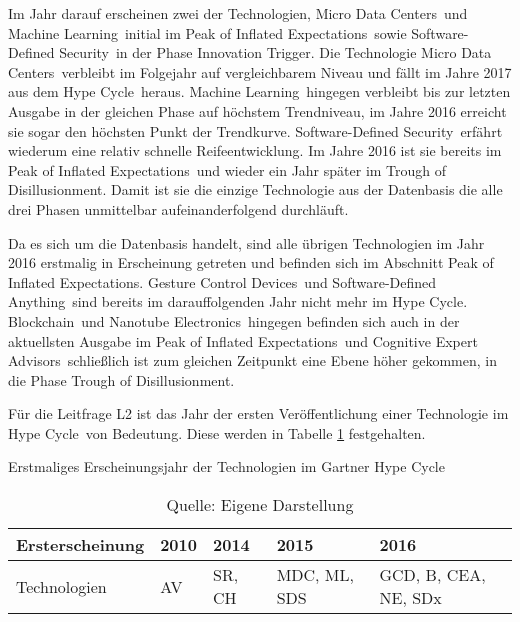 Im Jahr darauf erscheinen zwei der Technologien, \glqq Micro Data Centers\grqq~und \glqq Machine Learning\grqq~initial im \glqq Peak of Inflated Expectations\grqq~sowie \glqq Software-Defined Security\grqq~in der Phase \glqq Innovation Trigger\grqq. Die Technologie \glqq Micro Data Centers\grqq~verbleibt im Folgejahr auf vergleichbarem Niveau und fällt im Jahre 2017 aus dem \glqq Hype Cycle\grqq~heraus. \glqq Machine Learning\grqq~hingegen verbleibt bis zur letzten Ausgabe in der gleichen Phase auf höchstem Trendniveau, im Jahre 2016 erreicht sie sogar den höchsten Punkt der Trendkurve. \glqq Software-Defined Security\grqq~erfährt wiederum eine relativ schnelle Reife\-entwicklung. Im Jahre 2016 ist sie bereits im \glqq Peak of Inflated Expectations\grqq~und wieder ein Jahr später im \glqq Trough of Disillusionment\grqq. Damit ist sie die einzige Technologie aus der Datenbasis die alle drei Phasen unmittelbar aufeinanderfolgend durchläuft.

Da es sich um die Datenbasis handelt, sind alle übrigen Technologien im Jahr 2016 erstmalig in Erscheinung getreten und befinden sich im Abschnitt \glqq Peak of Inflated Expectations\grqq. \glqq Gesture Control Devices\grqq~und \glqq Software-Defined Anything\grqq~sind bereits im darauffolgenden Jahr nicht mehr im \glqq Hype Cycle\grqq. \glqq Blockchain\grqq~und \glqq Nanotube Electronics\grqq~hingegen befinden sich auch in der aktuellsten Ausgabe im \glqq Peak of Inflated Expectations\grqq~und \glqq Cognitive Expert Advisors\grqq~schließlich ist zum gleichen Zeitpunkt eine Ebene höher gekommen, in die Phase \glqq Trough of Disillusionment\grqq.

Für die Leitfrage L2 ist das Jahr der ersten Veröffentlichung einer Technologie im \glqq Hype Cycle\grqq~von Bedeutung. Diese werden in Tabelle \ref{tab:ghc_init} festgehalten.

\begin{table}
	\caption{Erstmaliges Erscheinungsjahr der Technologien im \glqq Gartner Hype Cycle\grqq}
	\selectfont
	\centering
	\label{tab:ghc_init}
	\begin{tabularx}{\linewidth}{X|p{3em}|X|X|X}
	Erst\-erscheinung & 2010 & 2014 & 2015 & 2016 \\
	\hline
	Technologien & \acs{AV} & \acs{SR}, \acs{CH} & \acs{MDC}, \acs{ML}, \acs{SDS} & \acs{GCD}, \acs{B}, \acs{CEA}, \acs{NE}, \acs{SDx} \\
	\end{tabularx}
	\caption*{Quelle: Eigene Darstellung}
\end{table}

